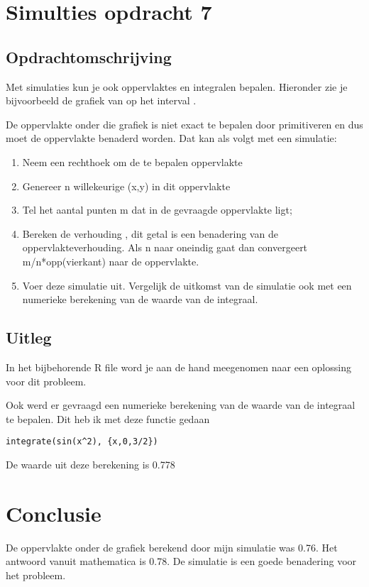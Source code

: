 \documentclass{article}
\begin{document}



\section{Simulties opdracht 7}
\label{sec:sample_main}

\subsection{Opdrachtomschrijving}
\label{subsec:sample_opdrom}

Met simulaties kun je ook oppervlaktes en integralen bepalen. Hieronder zie je bijvoorbeeld de grafiek van op het interval .

De oppervlakte onder die grafiek is niet exact te bepalen door primitiveren en dus moet de oppervlakte benaderd worden. Dat kan als volgt met een simulatie:

\begin{enumerate}[label=(\Alph*)]
\item Neem een rechthoek om de te bepalen oppervlakte

\item Genereer n willekeurige (x,y) in dit oppervlakte

\item Tel het aantal punten m dat in de gevraagde oppervlakte ligt;

\item Bereken de verhouding , dit getal is een benadering van de oppervlakteverhouding. Als n naar oneindig gaat dan convergeert m/n*opp(vierkant) naar de oppervlakte.

\item Voer deze simulatie uit. Vergelijk de uitkomst van de simulatie ook met een numerieke berekening van de waarde van de integraal.
\end{enumerate}

\newpage
\subsection{Uitleg}
\label{subsec:sample_uitv}

In het bijbehorende R file word je aan de hand meegenomen naar een oplossing voor dit probleem.

Ook werd er gevraagd een numerieke berekening van de waarde van de integraal te bepalen. Dit heb ik met deze functie gedaan
\begin{verbatim}
integrate(sin(x^2), {x,0,3/2})
\end{verbatim}

De waarde uit deze berekening is 0.778
\section{Conclusie}
\label{subsec:sample_con}
De oppervlakte onder de grafiek berekend door mijn simulatie was 0.76. Het antwoord vanuit mathematica is 0.78. De simulatie is een goede benadering voor het probleem.
\end{document}
